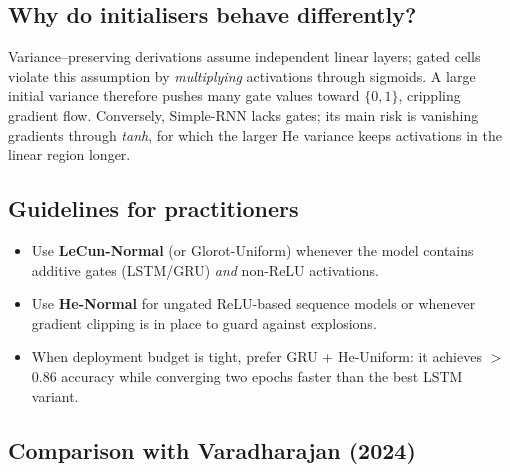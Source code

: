 \documentclass[conference]{IEEEtran}
\begin{document}
\subsection{Why do initialisers behave differently?}

Variance–preserving derivations assume independent linear layers; gated
cells violate this assumption by \emph{multiplying} activations through
sigmoids.  A large initial variance therefore pushes
many gate values toward $\{0,1\}$, crippling gradient flow.  Conversely,
Simple-RNN lacks gates; its main risk is vanishing gradients through
\textit{tanh}, for which the larger He variance keeps activations in the
linear region longer.

\subsection{Guidelines for practitioners}

\begin{itemize}
  \item Use \textbf{LeCun-Normal} (or Glorot-Uniform) whenever the model
        contains additive gates (LSTM/GRU) \emph{and} non-ReLU activations.
  \item Use \textbf{He-Normal} for ungated ReLU-based sequence models or
        whenever gradient clipping is in place to guard against explosions.
  \item When deployment budget is tight, prefer GRU + He-Uniform:
        it achieves \(>\)0.86 accuracy while converging two epochs faster
        than the best LSTM variant.
\end{itemize}

\subsection{Comparison with Varadharajan \cite{Varadharajan2024} (2024)}
\label{subsec:varadharajan_comparison}
\end{document}
